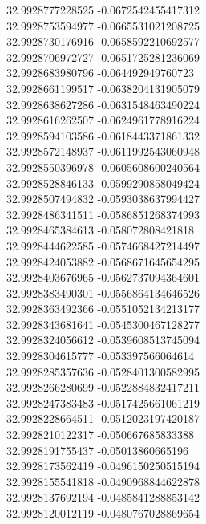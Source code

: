 {32.9928777228525	-0.0672542455417312\\
32.9928753594977	-0.0665531021208725\\
32.9928730176916	-0.0658592210692577\\
32.9928706972727	-0.0651725281236069\\
32.9928683980796	-0.064492949760723\\
32.9928661199517	-0.0638204131905079\\
32.9928638627286	-0.0631548463490224\\
32.9928616262507	-0.0624961778916224\\
32.9928594103586	-0.0618443371861332\\
32.9928572148937	-0.0611992543060948\\
32.9928550396978	-0.0605608600240564\\
32.9928528846133	-0.0599290858049424\\
32.9928507494832	-0.0593038637994427\\
32.9928486341511	-0.0586851268374993\\
32.9928465384613	-0.058072808421818\\
32.9928444622585	-0.0574668427214497\\
32.9928424053882	-0.0568671645654295\\
32.9928403676965	-0.0562737094364601\\
32.9928383490301	-0.0556864134646526\\
32.9928363492366	-0.0551052134213177\\
32.9928343681641	-0.0545300467128277\\
32.9928324056612	-0.0539608513745094\\
32.9928304615777	-0.053397566064614\\
32.9928285357636	-0.0528401300582995\\
32.9928266280699	-0.0522884832417211\\
32.9928247383483	-0.0517425661061219\\
32.9928228664511	-0.0512023197420187\\
32.9928210122317	-0.050667685833388\\
32.9928191755437	-0.05013860665196\\
32.9928173562419	-0.0496150250515194\\
32.9928155541818	-0.0490968844622878\\
32.9928137692194	-0.0485841288853142\\
32.9928120012119	-0.0480767028869654\\
}
